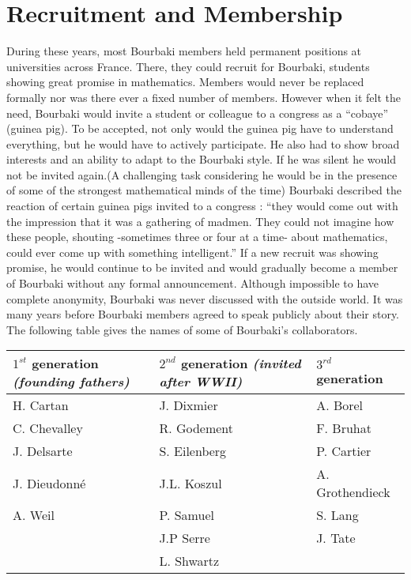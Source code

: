 \documentclass[12pt]{article}
\begin{document}
\section*{Recruitment and Membership}\normalsize

During these years, most Bourbaki members held permanent positions at 
universities across France. There, they could recruit for Bourbaki, students 
showing great promise in mathematics. Members would never be replaced formally 
nor was there ever a fixed number of members. However when it felt the need, 
Bourbaki would invite a student or colleague to a congress as a ``cobaye'' 
(guinea pig). To be accepted, not only would the guinea pig have to understand 
everything, but he would have to actively participate. He also had to show 
broad interests and an ability to adapt to the Bourbaki style. If he was 
silent he would not be invited again.(A challenging task considering he 
would be in the presence of some of the strongest mathematical minds of the 
time) Bourbaki described the reaction of certain guinea pigs invited to a 
congress : ``they would come out with the impression that it was a gathering 
of madmen. They could not imagine how these people, shouting -sometimes three 
or four at a time- about mathematics, could ever come up with something 
intelligent.''\cite{DJ} If a new recruit was showing promise, he would continue 
to be invited and would gradually become a member of Bourbaki without any 
formal announcement. Although impossible to have complete anonymity, Bourbaki 
was never discussed with the outside world. It was many years before Bourbaki 
members agreed to speak publicly about their story. The following table gives 
the names of some of Bourbaki's collaborators.
\begin{center}
\scriptsize
\begin{tabular}{|l|l|l|} \hline
\textbf{$1^{st}$ generation \textsl{(founding fathers)}} & \textbf{$2^{nd}$ 
generation \textsl{(invited after WWII)}} & \textbf{$3^{rd}$ generation} \\ 
\hline
H. Cartan & J. Dixmier & A. Borel \\
C. Chevalley & R. Godement & F. Bruhat \\
J. Delsarte & S. Eilenberg & P. Cartier \\
J. Dieudonn\'e & J.L. Koszul & A. Grothendieck \\
A. Weil & P. Samuel & S. Lang \\
& J.P Serre & J. Tate \\
& L. Shwartz & \\ \hline  
\end{tabular}
\end{center}
\end{document}
